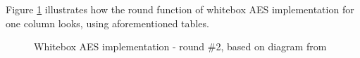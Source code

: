 \documentclass[11pt,oneside,final]{fithesis2}
\begin{document}
    Figure \ref{fig:wbaes} illustrates how the round function of whitebox AES implementation for one column looks, using aforementioned tables.
    \begin{figure}
    \begin{center}
    \leavevmode
    \centerline{}
    \end{center}
    \caption{Whitebox AES implementation - round \#2, based on diagram from~\citep{Muir_atutorial}}
    \label{fig:wbaes}
    \end{figure}
\end{document}
